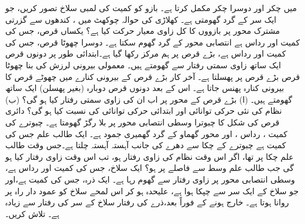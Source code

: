   میں  چکر اور دوسرا   چکر مکمل کرتا ہے۔ بازو کو    کمیت کی 
        لمبی  سلاخ تصور کریں، جو ایک سر کے گرد گھومتی  ہے۔ کھلاڑی کی حوالہ چوکھٹ میں ، کندھوں   سے گزرتی مشترک محور پر بازووں کا  کل زاوی معیار حرکت کیا ہے؟
یکساں قرص، جس کی کمیت  اور رداس  ہے انتصابی محور کے گرد گھوم سکتا ہے۔ دوسرا چھوٹا قرص، جس کی کمیت  اور رداس  ہے، بڑے قرص  پر ہم مرکز   رکھا گیا ہے۔ابتدائی طور پر دونوں قرص ایک ساتھ  زاوی  سمتی رفتار سے گھومتے ہیں۔ معمولی بیرونی لرزش کی بنا چھوٹا قرص بڑے قرص پر  پھسلتا ہے۔ آخر کار بڑے قرص کے بیرونی کنارے میں چھوٹے قرص کا بیرونی کنارہ پھنس جاتا ہے۔ اس کے بعد  دونوں قرص دوبارہ   (بغیر پھسلن) ایک ساتھ گھومتے ہیں۔ (ا)  بڑے قرص کے محور پر اب ان کی  زاوی سمتی  رفتار کیا ہو گی؟ (ب)  نظام کی نئی حرکی توانائی اور ابتدائی حرکی توانائی کی نسبت  کیا ہو گی؟
دائری قرص  کی شکل کا چبوترا وسطی انتصابی محور  پر  بلا رگڑ گھومتا ہے۔ چبوترے کی کمیت  ، رداس  ، اور محور گھماو کے گرد گھمیری جمود  ہے۔ ایک طالب علم جس کی کمیت  ہے چبوترے کے چکا سے دھرے کی جانب آہستہ آہستہ چلتا ہے۔جس وقت طالب علم چکا پر تھا،  اگر  اس وقت نظام کی زاوی رفتار  ہو، تب اس وقت زاوی رفتار کیا ہو گی جب طالب علم  وسط سے  فاصلے پر ہو؟
ایک سلاخ، جس کی کمیت اور  رداس  ہے، وسطی  انتصابی محور پر   زاوی رفتار سے گھوم رہا ہے۔ ایک ذرہ، جس کی کمیت  ہے،اور جو  سلاخ کے ایک سر سے چپکا ہوا ہے، علیحدہ ہو کر اس لمحے سلاخ کو عمود دار راہ پر روانا ہوتا ہے۔ خارج ہونے کے فوراً بعد،ذرے کی رفتار    سلاخ کے سر کی رفتار سے  زیادہ  ہے۔  تلاش کریں۔

